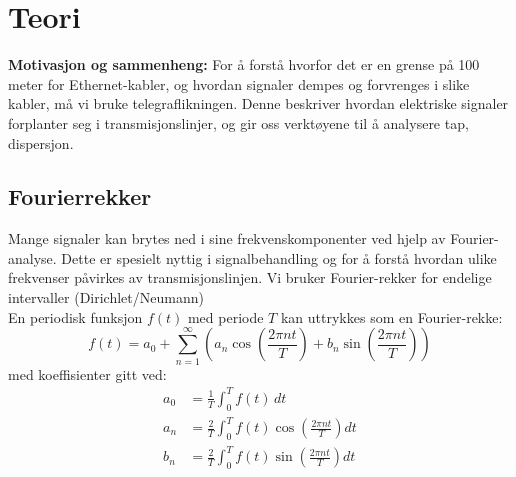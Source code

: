 
\section{Teori}

    \textbf{Motivasjon og sammenheng:} For å forstå hvorfor det er en grense på 100 meter for Ethernet-kabler, og hvordan signaler dempes og forvrenges i slike kabler, må vi bruke telegraflikningen. Denne beskriver hvordan elektriske signaler forplanter seg i transmisjonslinjer, og gir oss verktøyene til å analysere tap, dispersjon.

\subsection{Fourierrekker}

Mange signaler kan brytes ned i sine frekvenskomponenter ved hjelp av Fourier-analyse. Dette er spesielt nyttig i signalbehandling og for å forstå hvordan ulike frekvenser påvirkes av transmisjonslinjen. Vi bruker Fourier-rekker for endelige intervaller (Dirichlet/Neumann)\\[1em]
En periodisk funksjon $f(t)$ med periode $T$ kan uttrykkes som en Fourier-rekke:
\begin{equation}
f(t) = a_0 + \sum_{n=1}^{\infty} \left( a_n \cos\left(\frac{2\pi n t}{T}\right) + b_n \sin\left(\frac{2\pi n t}{T}\right) \right)
\end{equation}
med koeffisienter gitt ved:
\begin{align*}
a_0 &= \frac{1}{T} \int_{0}^{T} f(t) \, dt \\
a_n &= \frac{2}{T} \int_{0}^{T} f(t) \cos\left(\frac{2\pi n t}{T}\right) dt \\
b_n &= \frac{2}{T} \int_{0}^{T} f(t) \sin\left(\frac{2\pi n t}{T}\right) dt
\end{align*}

